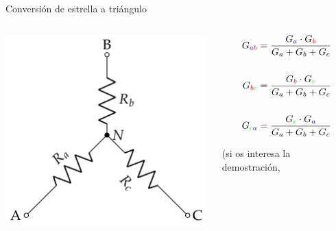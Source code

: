 \documentclass[aspectratio=169, xcolor={usenames,svgnames,dvipsnames}]{beamer}
\begin{document}
\begin{frame}
{Conversión de estrella a triángulo}
    \begin{columns}
    \begin{column}{0.3\columnwidth}
    \begin{center}
    \includegraphics[width=.9\linewidth]{../figs/Conexion_Estrella.pdf}
    \end{center}
    \end{column}
    \begin{column}{0.4\columnwidth}
    \vspace*{5mm}
    \begin{align*}
      G_{{\color{blue}a}{\color{red}b}} &= \frac{G_{\color{blue}a} \cdot G_{\color{red}b}}{G_a + G_b + G_c}\\
      \\
      G_{{\color{red}b}{\color{green}c}} &= \frac{G_{\color{red}b} \cdot G_{\color{green}c}}{G_a + G_b + G_c}\\
      \\
      G_{{\color{green}c}{\color{blue}a}} &= \frac{G_{\color{green}c} \cdot G_{\color{blue}a}}{G_a + G_b + G_c}
    \end{align*}

    \vspace*{5mm}
    \centering \small{(si os interesa la demostración, 
    
}
\end{column}
\end{columns}
\end{frame}
\end{document}

